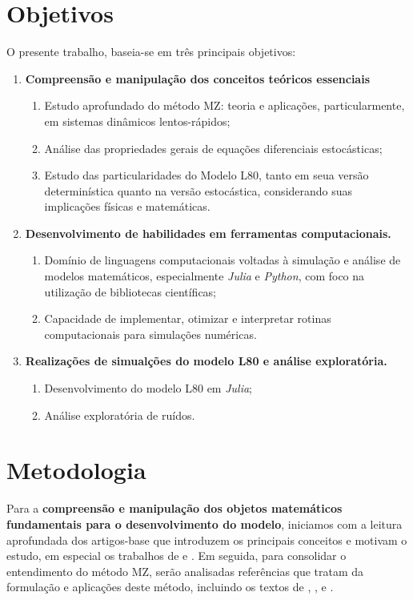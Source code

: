 \documentclass[12pt]{article}
\begin{document}
\section*{Objetivos}
O presente trabalho, baseia-se em três principais objetivos:
\begin{enumerate}
	\item \textbf{Compreensão e manipulação dos conceitos teóricos essenciais}
	      \begin{enumerate}
	      	\item Estudo aprofundado do método MZ: teoria e aplicações, particularmente, em sistemas dinâmicos lentos-rápidos;
	      	\item Análise das propriedades gerais de equações diferenciais estocásticas;
	      	\item Estudo das particularidades do Modelo L80, tanto em seua versão determinística quanto na versão estocástica, considerando suas implicações físicas e matemáticas.
	      \end{enumerate}
	      
	\item \textbf{Desenvolvimento de habilidades em ferramentas computacionais.}
	      \begin{enumerate}
	      	\item Domínio de linguagens computacionais voltadas à simulação e análise de modelos matemáticos, especialmente \textit{Julia} e \textit{Python}, com foco na utilização de bibliotecas científicas;
	      	\item Capacidade de implementar, otimizar e interpretar rotinas computacionais para simulações numéricas.
	      \end{enumerate}
	      
	\item \textbf{Realizações de simualções do modelo L80 e análise exploratória.}
	      \begin{enumerate}
	      	\item Desenvolvimento do modelo L80 em \textit{Julia};
	      	\item Análise exploratória de ruídos.
	      \end{enumerate}
\end{enumerate}


\section*{Metodologia}
Para a \textbf{compreensão e manipulação dos objetos matemáticos fundamentais para o desenvolvimento do modelo}, iniciamos com a leitura aprofundada dos artigos-base que introduzem os principais conceitos e motivam o estudo, em especial os trabalhos de \citet{Chekroun2017} e \citet{Chekroun2021}. Em seguida, para consolidar o entendimento do método MZ, serão analisadas referências que tratam da formulação e aplicações deste método, incluindo os textos de \citet{Gouasmi2017}, \citet{Chorin2000}, \citet{Chorin2002} e \citet{Chorin2013}.
\end{document}
